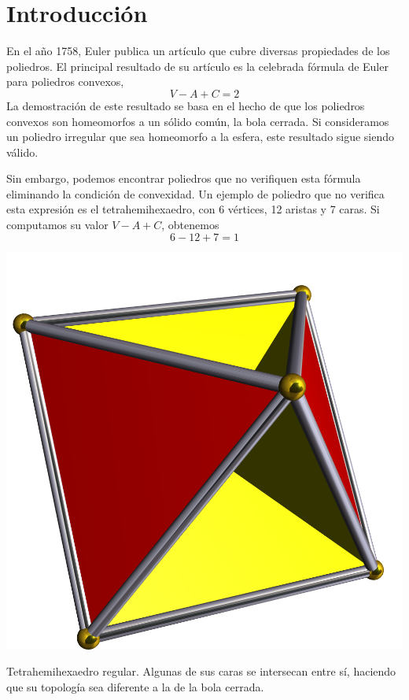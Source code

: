 \chapter*{Introducción}
En el año 1758, Euler publica un artículo que cubre diversas propiedades de los poliedros. El principal resultado de su artículo es la celebrada fórmula de Euler para poliedros convexos,
\[V-A+C=2\]
La demostración de este resultado se basa en el hecho de que los poliedros convexos son homeomorfos a un sólido común, la bola cerrada. Si consideramos un poliedro irregular que sea homeomorfo a la esfera, este resultado sigue siendo válido.

Sin embargo, podemos encontrar poliedros que no verifiquen esta fórmula eliminando la condición de convexidad. Un ejemplo de poliedro que no verifica esta expresión es el tetrahemihexaedro, con 6 vértices, 12 aristas y 7 caras. Si computamos su valor $V-A+C$, obtenemos
\[6-12+7=1\]

\begin{marginfigure}
\includegraphics{Figures/Tetrahemihexahedron.png}
\caption[Tetrahemihexaedro]{Tetrahemihexaedro regular. Algunas de sus caras se intersecan entre sí, haciendo que su topología sea diferente a la de la bola cerrada.}
\end{marginfigure}

